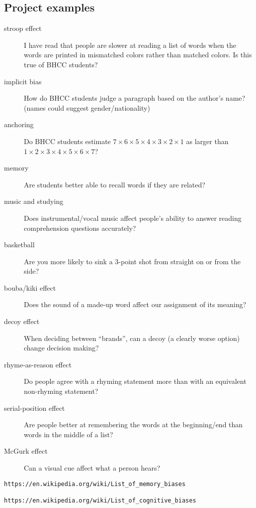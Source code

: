 \documentclass[12pt,letterpaper]{article}
\begin{document}
\subsection*{Project examples}
\begin{description}
\item[stroop effect] I have read that people are slower at reading a list of words when the words are printed in mismatched colors rather than matched colors. Is this true of BHCC students?
\item[implicit bias] How do BHCC students judge a paragraph based on the author's name? (names could suggest gender/nationality)
\item[anchoring] Do BHCC students estimate $7\times6\times5\times4\times3\times2\times1$ as larger than $1\times2\times3\times4\times5\times6\times7$?
\item[memory] Are students better able to recall words if they are related?
\item[music and studying] Does instrumental/vocal music affect people's ability to answer reading comprehension questions accurately?
\item[basketball] Are you more likely to sink a 3-point shot from straight on or from the side?
\item[bouba/kiki effect] Does the sound of a made-up word affect our assignment of its meaning?
\item[decoy effect] When deciding between ``brands'', can a decoy (a clearly worse option) change decision making?
\item[rhyme-as-reason effect] Do people agree with a rhyming statement more than with an equivalent non-rhyming statement?
\item[serial-position effect] Are people better at remembering the words at the beginning/end than words in the middle of a list?
\item[McGurk effect] Can a visual cue affect what a person hears?
\end{description}

\begin{verbatim}
https://en.wikipedia.org/wiki/List_of_memory_biases

https://en.wikipedia.org/wiki/List_of_cognitive_biases
\end{verbatim}
\end{document}
